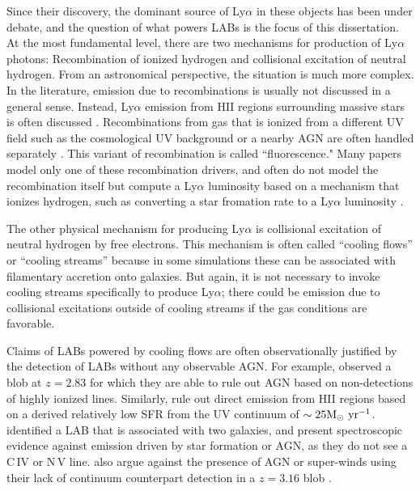 Since their discovery, the dominant source of Ly$\alpha$ in these objects has been under debate, and the question of what powers LABs is the focus of this dissertation.
At the most fundamental level, there are two mechanisms for production of Ly$\alpha$ photons: Recombination of ionized hydrogen and collisional excitation of neutral hydrogen.
From an astronomical perspective, the situation is much more complex.
In the literature, emission due to recombinations is usually not discussed in a general sense.
Instead, Ly$\alpha$ emission from HII regions surrounding massive stars is often discussed \citep[e.g.][]{Geach2016}.
Recombinations from gas that is ionized from a different UV field such as the cosmological UV background or a nearby AGN are often handled separately \citep{Kollmeier2010,Gronke2017}.
This variant of recombination is called ``fluorescence."
Many papers model only one of these recombination drivers, and often do not model the recombination itself but compute a Ly$\alpha$ luminosity based on a mechanism that ionizes hydrogen, such as converting a star fromation rate to a Ly$\alpha$ luminosity \citep[e.g.][]{Cen2013}.

The other physical mechanism for producing Ly$\alpha$ is collisional excitation of neutral hydrogen by free electrons.
This mechanism is often called ``cooling flows'' or ``cooling streams'' because in some simulations these can be associated with filamentary accretion onto galaxies.
But again, it is not necessary to invoke cooling streams specifically to produce Ly$\alpha$; there could be emission due to collisional excitations outside of cooling streams if the gas conditions are favorable.

Claims of LABs powered by cooling flows are often observationally justified by the detection of LABs without any observable AGN.
For example, \citet{Smith2007} observed a blob at $z=2.83$ for which they are able to rule out AGN based on non-detections of highly ionized lines.
Similarly, \citet{Smith2007} rule out direct emission from HII regions based on a derived relatively low SFR from the UV continuum of  $\sim 25 \rm{M}_{\odot}\ \rm{yr}^{-1}$.
 \citet{Scarlata2009} identified a LAB that is associated with two galaxies, and present spectroscopic evidence against emission driven by star formation or AGN, as they do not see a C\,\textsc{IV} or N\,\textsc{V} line.
\citet{Nilsson2006} also argue against the presence of AGN or super-winds using their lack of continuum counterpart detection in a $z=3.16$ blob \citep[though this is debated, see e.g.][]{Prescott2015}.

